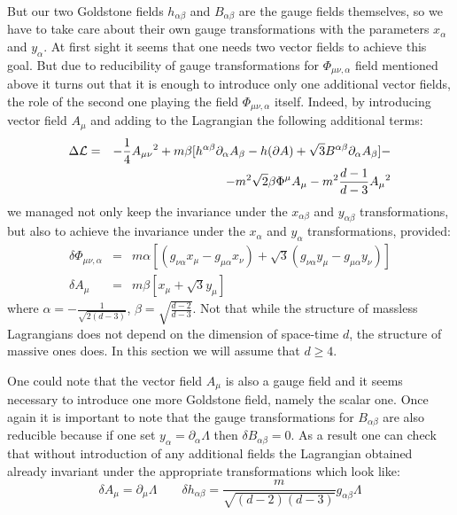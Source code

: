 \documentclass[a4paper,12pt]{article}
\begin{document}
But our two Goldstone fields $h_{\alpha\beta}$ and $B_{\alpha\beta}$
are the gauge fields themselves, so we have to take care about their
own gauge transformations with the parameters $x_\alpha$ and $y_\alpha$.
At first sight it seems that one needs two vector fields to achieve this
goal. But due to reducibility of gauge transformations for
$\Phi_{\mu\nu,\alpha}$ field mentioned above it turns out that it is
enough to introduce only one additional vector fields, the role of the
second one playing the field $\Phi_{\mu\nu,\alpha}$ itself. Indeed, by
introducing vector field $A_\mu$ and adding to the Lagrangian the
following additional terms:
\begin{eqnarray}
\Delta {\cal L} &=& - \frac{1}{4} A_{\mu\nu}{}^2 + m \beta [ h^{\alpha\beta}
\partial_\alpha A_\beta - h (\partial A) + \sqrt{3} B^{\alpha\beta}
\partial_\alpha A_\beta ] - \nonumber \\
 && - m^2 \sqrt{2} \beta \Phi^\mu A_\mu - m^2 \frac{d-1}{d-3} A_\mu{}^2
\end{eqnarray}
we managed not only keep the invariance under the $x_{\alpha\beta}$
and $y_{\alpha\beta}$ transformations, but also to achieve the invariance
under the $x_\alpha$ and $y_\alpha$ transformations, provided:
\begin{eqnarray}
\delta \Phi_{\mu\nu,\alpha} &=& m \alpha [ (g_{\nu\alpha} x_\mu - g_{\mu\alpha}
x_\nu) + \sqrt{3} (g_{\nu\alpha} y_\mu - g_{\mu\alpha} y_\nu)] \nonumber \\
\delta A_\mu &=& m \beta [ x_\mu + \sqrt{3} y_\mu ]
\end{eqnarray}
where $\alpha = - \frac{1}{\sqrt{2(d-3)}}$, $\beta = \sqrt{\frac{d-2}{d-3}}$.
Not that while the structure of massless Lagrangians does not depend on
the dimension of space-time $d$, the structure of massive ones does. In
this section we will assume that $d \ge 4$.

One could note that the vector field $A_\mu$ is also a gauge field and it
seems necessary to introduce one more Goldstone field, namely the scalar
one. Once again it is important to note that the gauge transformations for
$B_{\alpha\beta}$ are also reducible because if one set $y_\alpha =
\partial_\alpha \Lambda$ then $\delta B_{\alpha\beta} = 0$. As a result
one can check that without introduction of any additional fields the
Lagrangian obtained already invariant under the appropriate
transformations which look like:
\begin{equation}
\delta A_\mu = \partial_\mu \Lambda \qquad \delta h_{\alpha\beta} =
\frac{m}{\sqrt{(d-2)(d-3)}} g_{\alpha\beta} \Lambda
\end{equation}
\end{document}

